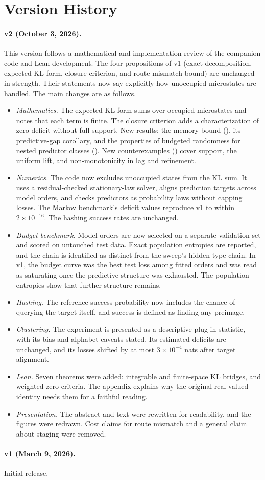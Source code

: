 \section{Version History}\label{app:versions}

\paragraph{v2 (October 3, 2026).} This version follows a mathematical and implementation review of the companion code and Lean development. The four propositions of v1 (exact decomposition, expected KL form, closure criterion, and route-mismatch bound) are unchanged in strength. Their statements now say explicitly how unoccupied microstates are handled. The main changes are as follows.
\begin{itemize}
\item \emph{Mathematics.} The expected KL form sums over occupied microstates and notes that each term is finite. The closure criterion adds a characterization of zero deficit without full support. New results: the memory bound (), its predictive-gap corollary, and the properties of budgeted randomness for nested predictor classes (). New counterexamples () cover support, the uniform lift, and non-monotonicity in lag and refinement.
\item \emph{Numerics.} The code now excludes unoccupied states from the KL sum. It uses a residual-checked stationary-law solver, aligns prediction targets across model orders, and checks predictors as probability laws without capping losses. The Markov benchmark's deficit values reproduce v1 to within $2\times10^{-16}$. The hashing success rates are unchanged.
\item \emph{Budget benchmark.} Model orders are now selected on a separate validation set and scored on untouched test data. Exact population entropies are reported, and the chain is identified as distinct from the sweep's hidden-type chain. In v1, the budget curve was the best test loss among fitted orders and was read as saturating once the predictive structure was exhausted. The population entropies show that further structure remains.
\item \emph{Hashing.} The reference success probability now includes the chance of querying the target itself, and success is defined as finding any preimage.
\item \emph{Clustering.} The experiment is presented as a descriptive plug-in statistic, with its bias and alphabet caveats stated. Its estimated deficits are unchanged, and its losses shifted by at most $3\times10^{-4}$ nats after target alignment.
\item \emph{Lean.} Seven theorems were added: integrable and finite-space KL bridges, and weighted zero criteria. The appendix explains why the original real-valued identity needs them for a faithful reading.
\item \emph{Presentation.} The abstract and text were rewritten for readability, and the figures were redrawn. Cost claims for route mismatch and a general claim about staging were removed.
\end{itemize}

\paragraph{v1 (March 9, 2026).} Initial release.
